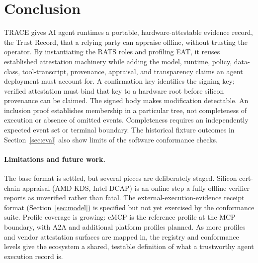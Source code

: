 \section{Conclusion}
\label{sec:conclusion}

TRACE gives AI agent runtimes a portable, hardware-attestable evidence record, the
Trust Record, that a relying party can appraise offline, without trusting the
operator. By instantiating the RATS roles and profiling EAT, it reuses established
attestation machinery while adding the model, runtime, policy, data-class,
tool-transcript, provenance, appraisal, and transparency claims an agent deployment
must account for. A confirmation key identifies the signing key; verified attestation must bind
that key to a hardware root before silicon provenance can be claimed. The signed
body makes modification detectable. An inclusion proof establishes membership
in a particular tree, not completeness of execution or absence of omitted events.
Completeness requires an independently expected event set or terminal boundary.
The historical fixture outcomes in Section~\ref{sec:eval} also show limits of
the software conformance checks.

\paragraph{Limitations and future work.}
The base format is settled, but several pieces are deliberately staged. Silicon
cert-chain appraisal (AMD KDS, Intel DCAP) is an online step a fully offline verifier
reports as unverified rather than fatal. The external-execution-evidence receipt
format (Section~\ref{sec:model}) is specified but not yet exercised by the conformance
suite. Profile coverage is growing: cMCP is the reference profile at the MCP boundary,
with A2A and additional platform profiles planned. As more profiles and vendor
attestation surfaces are mapped in, the registry and conformance levels give the
ecosystem a shared, testable definition of what a trustworthy agent execution record
is.
